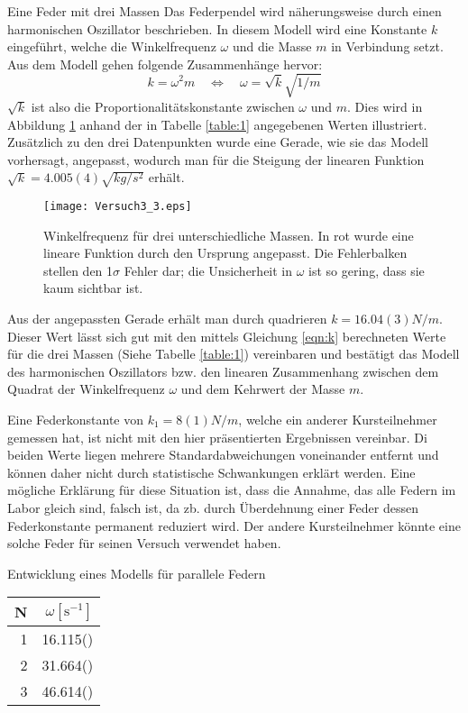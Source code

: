 \documentclass{alex_gp}
\begin{document}
\begin{mybox}{Eine Feder mit drei Massen}
	Das Federpendel wird näherungsweise durch einen harmonischen Oszillator beschrieben. In diesem Modell wird eine Konstante \( k \) eingeführt, welche die Winkelfrequenz \( \omega \) und die Masse \( m \) in Verbindung setzt. Aus dem Modell gehen folgende Zusammenhänge hervor:
	\begin{equation}\label{eqn:k}
		k = \omega^2 m \quad \Leftrightarrow\quad \omega = \sqrt{k}\sqrt{1/m}
	\end{equation}
	\( \sqrt{k} \) ist also die Proportionalitätskonstante zwischen \( \omega \) und \( m \). Dies wird in Abbildung \ref{fig:sqrt} anhand der in Tabelle \ref{table:1} angegebenen Werten illustriert. Zusätzlich zu den drei Datenpunkten wurde eine Gerade, wie sie das Modell vorhersagt, angepasst, wodurch man für die Steigung der linearen Funktion \( \sqrt{k} = 4.005(4) \unit{\sqrt{kg / s^2}} \) erhält.
	\begin{figure}[H]
		\centering
		\texttt{[image: Versuch3\_3.eps]}
		\caption{Winkelfrequenz für drei unterschiedliche Massen. In rot wurde eine lineare Funktion durch den Ursprung angepasst. Die Fehlerbalken stellen den 1$\sigma$ Fehler dar; die Unsicherheit in \( \omega \) ist so gering, dass sie kaum sichtbar ist.}
		\label{fig:sqrt}
	\end{figure}
	Aus der angepassten Gerade erhält man durch quadrieren \( k = 16.04(3) \unit{N/m} \). Dieser Wert lässt sich gut mit den mittels Gleichung \ref{eqn:k} berechneten Werte für die drei Massen (Siehe Tabelle \ref{table:1}) vereinbaren und bestätigt das Modell des harmonischen Oszillators bzw. den linearen Zusammenhang zwischen dem Quadrat der Winkelfrequenz $\omega$ und dem Kehrwert der Masse \( m \). 

	Eine Federkonstante von \( k_1 = 8(1) \unit{N/m} \), welche ein anderer Kursteilnehmer gemessen hat, ist nicht mit den hier präsentierten Ergebnissen vereinbar. Di beiden Werte liegen mehrere Standardabweichungen voneinander entfernt und können daher nicht durch statistische Schwankungen erklärt werden. Eine mögliche Erklärung für diese Situation ist, dass die Annahme, das alle Federn im Labor gleich sind, falsch ist, da zb. durch Überdehnung einer Feder dessen Federkonstante permanent reduziert wird. Der andere Kursteilnehmer könnte eine solche Feder für seinen Versuch verwendet haben.
\end{mybox}

\begin{mybox}{Entwicklung eines Modells für parallele Federn}
	
	
	
	\begin{tabular}{@{}r | r @{}}\toprule
		N & \( \omega [\text{s}^{-1}]\) \\ \midrule
		1 & 16.115() \\
		2 & 31.664() \\
		3 & 46.614() \\
		\bottomrule
	\end{tabular}
\end{mybox}
\end{document}

